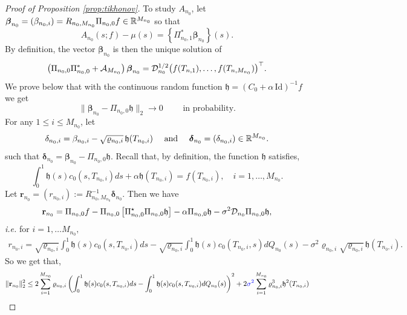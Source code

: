 \documentclass{article}
\begin{document}
\begin{proof}[Proof of Proposition \ref{prop:tikhonov}]
To study $A_{n_0}$, 
let $\boldsymbol{\beta}_{n_0}  = (\beta_{n_0,i})= R_{n_0,M_{n_0}}\Pi_{n_0,0}f \in \mathbb{R}^{M_{n_0}}$ so that 
$$
A_{n_0}(s;f) - \mu(s) = \left\{\Pi_{n_0,1}^* \boldsymbol{\beta}_{n_0}\right\}(s) .
$$
By definition, the vector $\boldsymbol{\beta}_{n_0}$ is then the unique solution of 
\begin{equation}\label{eq:proof:tikhonov:alpha0}
\left(\Pi_{n_0,0}\Pi_{n_0,0}^* + \mathcal A_{M_{n_0}}  \right)\boldsymbol{\beta}_{n_0} =  \mathcal{D}_{n_0}^{1/2} \big(f(T_{n,1}),\ldots,f(T_{n,M_{n_0}})\big)^\top.
\end{equation}
We prove below that with the continuous random function $\mathfrak h=(C_0+\alpha\,\mathrm{Id})^{-1}f$ we get 
\begin{equation}\label{beta_proba_cvg}
\| \boldsymbol{\beta}_{n_0} - \Pi_{n_0,0} \mathfrak h\|_{2} \to 0 \qquad \text{  in probability}.
\end{equation}
For any $1\leq  i\le M_{n_0}$, let 
$$
\delta_{n_0,i} =  {\beta}_{n_0,i} - \sqrt{\varrho_{n_0,i}}\,  \mathfrak h(T_{n_0,i}) \quad \text{ and } \quad \boldsymbol{\delta}_{n_0} = (\delta_{n_0,i})\in\mathbb{R}^{M_{n_0}}.
$$ 
such that $\boldsymbol{\delta}_{n_0} = \boldsymbol{\beta}_{n_0} - \Pi_{n_0,0} \mathfrak h $. Recall that, by definition, the function $\mathfrak h$ satisfies,
\begin{equation}\label{eq:proof:tikhonov:h}
\int_0^1 \mathfrak h(s)c_0(s,T_{n_0,i})ds + \alpha \mathfrak h(T_{n_0,i}) = f(T_{n_0,i}), \quad i=1,\ldots,M_{n_0}.
\end{equation}
Let $\mathbf{r}_{n_0}= (r_{n_0,i}):=R_{n_0,M_{n_0}}^{-1}\boldsymbol{\delta}_{n_0}$. Then we have
\begin{align*}
\mathbf{r}_{n_0} = \Pi_{n_0,0}f  - \Pi_{n_0,0}\left[\Pi_{n_0,0}^\star\Pi_{n_0,0} \mathfrak h\right] - \alpha \Pi_{n_0,0} \mathfrak h - \sigma^2  \mathcal{D}_{n_0} \Pi_{n_0,0} \mathfrak h,
\end{align*}
\textit{i.e.} for $i=1,\ldots M_{n_0},$
\begin{align*}
r_{n_0,i} =  \sqrt{\varrho_{n_0,i}} \int_0^1 \mathfrak h(s)c_0(s,T_{n_0,i})ds  -  \sqrt{\varrho_{n_0,i}} \int_0^1 \mathfrak h(s)c_0(T_{n_0,i},s)dQ_{n_0}(s) - \sigma^2 \varrho_{n_0,i} \sqrt{\varrho_{n_0,i}} \,\mathfrak h(T_{n_0,i}).
\end{align*}
So we get that,
\begin{align*}
\|\mathbf{r}_{n_0}\|^2_2 &\leq 2\sum_{i=1}^{M_{n_0}} \varrho_{n_0,i} \left(\int_0^1 \mathfrak h(s)c_0(s,T_{n_0,i})ds - \int_0^1 \mathfrak h(s)c_0(s,T_{n_0,i})dQ_{n_0}(s)\right)^2+2 \color{blue} \sigma^2 \color{black}  \sum_{i=1}^{M_{n_0}} \varrho_{n_0,i}^3 \mathfrak h^2(T_{n_0,i})\\

\end{align*}
\end{proof}
\end{document}
